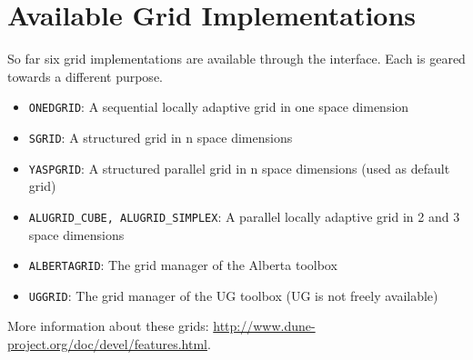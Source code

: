 \section{Available Grid Implementations}\label{availablegrids}
 So far six grid implementations are available through the \Grid interface. Each is geared towards a different purpose.
\begin{itemize}
    \item \texttt{ONEDGRID}: A sequential locally adaptive grid in one space dimension
    \item \texttt{SGRID}: A structured grid in n space dimensions
    \item \texttt{YASPGRID}: A structured parallel grid in n space dimensions (used as default grid)
    \item \texttt{ALUGRID\_CUBE, ALUGRID\_SIMPLEX}: A parallel locally adaptive grid in 2 and 3 space dimensions
    \item \texttt{ALBERTAGRID}: The grid manager of the Alberta toolbox
    \item \texttt{UGGRID}: The grid manager of the UG toolbox (UG is not freely available)
\end{itemize}
More information about these grids: \url{http://www.dune-project.org/doc/devel/features.html}.




